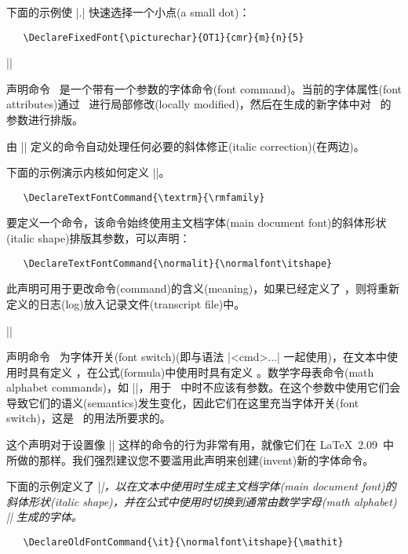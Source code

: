\documentclass{ltxguide}[1995/11/28]
\newcommand{\kaiti}{\CJKfamily{kaiti}} %
\begin{document}
下面的示例使 |{\picturechar .}| 快速选择一个小点(a small dot)：
\begin{verbatim}
   \DeclareFixedFont{\picturechar}{OT1}{cmr}{m}{n}{5}
\end{verbatim}

\begin{decl}
|\DeclareTextFontCommand|  
\end{decl}

声明命令 \ 是一个带有一个参数的字体命令(font command)。当前的字体属性(font attributes)通过 \ 进行局部修改(locally modified)，然后在生成的新字体中对 \ 的参数进行排版。

由 |\DeclareTextFontCommand| 定义的命令自动处理任何必要的斜体修正(italic correction)(在两边)。

下面的示例演示内核如何定义 |\textrm|。
\begin{verbatim}
   \DeclareTextFontCommand{\textrm}{\rmfamily}
\end{verbatim}

要定义一个命令，该命令始终使用主文档字体(main document font)的斜体形状(italic shape)排版其参数，可以声明：
\begin{verbatim}
   \DeclareTextFontCommand{\normalit}{\normalfont\itshape}
\end{verbatim}

此声明可用于更改命令(command)的含义(meaning)，如果已经定义了 ，则将重新定义的日志(log)放入记录文件(transcript file)中。

\begin{decl}
  |\DeclareOldFontCommand|  
\end{decl}

声明命令 \ 为字体开关(font switch)(即与语法 |{<cmd>...}| 一起使用)，在文本中使用时具有定义 ，在公式(formula)中使用时具有定义 。数学字母表命令(math alphabet commands)，如 |\mathit|，用于 \ 中时不应该有参数。在这个参数中使用它们会导致它们的语义(semantics)发生变化，因此它们在这里充当字体开关(font switch)，这是 \ 的用法所要求的。

这个声明对于设置像 |\rm| 这样的命令的行为非常有用，就像它们在 \LaTeX~2.09\ 中所做的那样。我们强烈建议您{\kaiti 不要}滥用此声明来创建(invent)新的字体命令。

下面的示例定义了 |\it|，以在文本中使用时生成主文档字体(main document font)的斜体形状(italic shape)，并在公式中使用时切换到通常由数学字母(math alphabet) |\mathit| 生成的字体。
\begin{verbatim}
   \DeclareOldFontCommand{\it}{\normalfont\itshape}{\mathit}
\end{verbatim}
\end{document}
